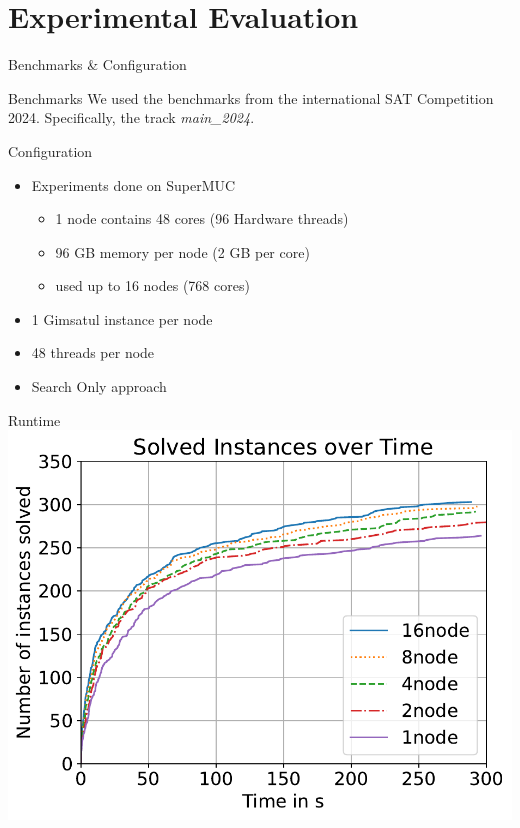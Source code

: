 \documentclass[]{sdqbeamer}
\begin{document}
\section{Experimental Evaluation}
\begin{frame}{Benchmarks \& Configuration}
    \begin{block}{Benchmarks}
        We used the benchmarks from the international SAT Competition 2024. Specifically, the track \textit{main\_2024}.
    \end{block}

    \begin{block}{Configuration}
        \begin{itemize}
            \item Experiments done on SuperMUC
            \begin{itemize}
                \item 1 node contains 48 cores (96 Hardware threads)
                \item 96 GB memory per node (2 GB per core)
                \item used up to 16 nodes (768 cores)
            \end{itemize}
            \item 1 Gimsatul instance per node
            \item 48 threads per node
            \item Search Only approach
        \end{itemize}
    \end{block}
\end{frame}

\begin{frame}{Runtime}
    \center
    \includegraphics[scale=1]{plots/cumulative_runtime/scalability_gim.pdf}
\end{frame}
\end{document}
